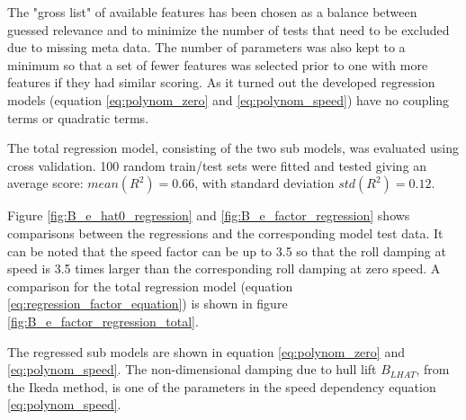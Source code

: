 The "gross list" of available features has been chosen as a balance between guessed relevance and to minimize the number of tests that need to be excluded due to missing meta data. 
The number of parameters was also kept to a minimum so that a set of fewer features was selected prior to one with more features if they had similar scoring. As it turned out the developed regression models (equation \ref{eq:polynom_zero} and \ref{eq:polynom_speed}) have no coupling terms or quadratic terms.

The total regression model, consisting of the two sub models, was evaluated using cross validation. 100 random train/test sets were fitted and tested giving an average score: $mean(R^2)=0.66$, with standard deviation $std(R^2)=0.12$.

Figure \ref{fig:B_e_hat0_regression} and \ref{fig:B_e_factor_regression} shows comparisons between the regressions and the corresponding model test data. It can be noted that the speed factor can be up to 3.5 so that the roll damping at speed is 3.5 times larger than the corresponding roll damping at zero speed. A comparison for the total regression model (equation \ref{eq:regression_factor_equation}) is shown in figure \ref{fig:B_e_factor_regression_total}.

 The regressed sub models are shown in equation \ref{eq:polynom_zero} and \ref{eq:polynom_speed}. The non-dimensional damping due to hull lift $B_{LHAT}$, from the Ikeda method, is one of the parameters in the speed dependency equation \ref{eq:polynom_speed}.




